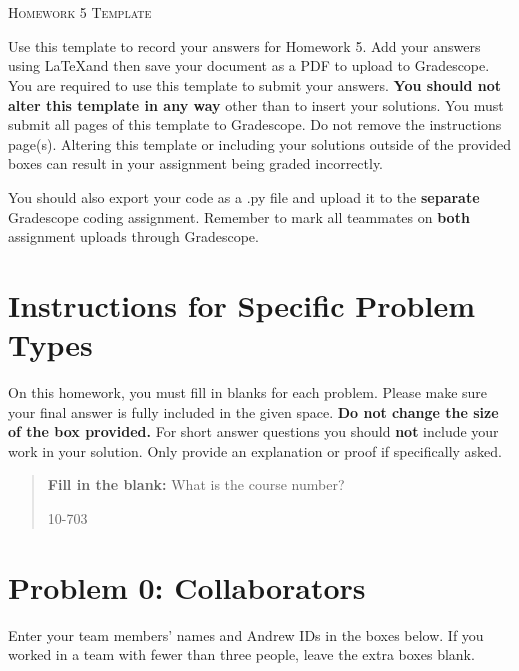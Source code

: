 \documentclass[12pt]{article}
\begin{document}
\section*{}
\begin{center}
  \centerline{\textsc{\LARGE  Homework 5 Template}}
\end{center}

Use this template to record your answers for Homework 5. Add your answers using \LaTeX and then save your document as a PDF to upload to Gradescope.  You are required to use this template to submit your answers.  \textbf{You should not alter this template in any way} other than to insert your solutions.  You must submit all \pageref{LastPage} pages of this template to Gradescope.  Do not remove the instructions page(s).  Altering this template or including your solutions outside of the provided boxes can result in your assignment being graded incorrectly.

You should also export your code as a .py file and upload it to the \textbf{separate} Gradescope coding assignment. Remember to mark all teammates on \textbf{both} assignment uploads through Gradescope.

\section*{Instructions for Specific Problem Types}

On this homework, you must fill in blanks for each problem. Please make sure your final answer is fully included in the given space.  \textbf{Do not change the size of the box provided.}  For short answer questions you should \textbf{not} include your work in your solution.  Only provide an explanation or proof if specifically asked.

\begin{quote}
\textbf{Fill in the blank:} What is the course number?

\begin{tcolorbox}[fit,height=1cm, width=4cm, blank, borderline={1pt}{-2pt},nobeforeafter]
    \begin{center}\huge10-703\end{center}
    \end{tcolorbox}
\end{quote}

\newpage

\section*{Problem 0: Collaborators}
Enter your team members' names and Andrew IDs in the boxes below. If you worked in a team with fewer than three people, leave the extra boxes blank.
\end{document}
